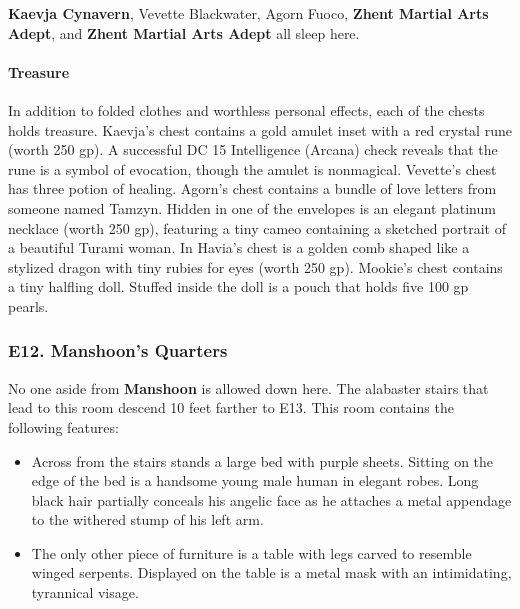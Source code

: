 \documentclass[10pt,a4paper,twoside,twocolumn,openany,nodeprecatedcode]{dndbook}
\begin{document}
\textbf{Kaevja Cynavern}, Vevette Blackwater, Agorn Fuoco, \textbf{Zhent Martial Arts Adept}, and \textbf{Zhent Martial Arts Adept} all sleep here.
\paragraph{Treasure}
In addition to folded clothes and worthless personal effects, each of the chests holds treasure.
Kaevja's chest contains a gold amulet inset with a red crystal rune (worth 250 gp). A successful DC 15 Intelligence (Arcana) check reveals that the rune is a symbol of evocation, though the amulet is nonmagical.
Vevette's chest has three potion of healing.
Agorn's chest contains a bundle of love letters from someone named Tamzyn. Hidden in one of the envelopes is an elegant platinum necklace (worth 250 gp), featuring a tiny cameo containing a sketched portrait of a beautiful Turami woman.
In Havia's chest is a golden comb shaped like a stylized dragon with tiny rubies for eyes (worth 250 gp).
Mookie's chest contains a tiny halfling doll. Stuffed inside the doll is a pouch that holds five 100 gp pearls.
\subsubsection{E12. Manshoon's Quarters}
No one aside from \textbf{Manshoon} is allowed down here. The alabaster stairs that lead to this room descend 10 feet farther to E13.
This room contains the following features:
\begin{itemize}

\item Across from the stairs stands a large bed with purple sheets. Sitting on the edge of the bed is a handsome young male human in elegant robes. Long black hair partially conceals his angelic face as he attaches a metal appendage to the withered stump of his left arm.
\item The only other piece of furniture is a table with legs carved to resemble winged serpents. Displayed on the table is a metal mask with an intimidating, tyrannical visage.
\end{itemize}
\end{document}
